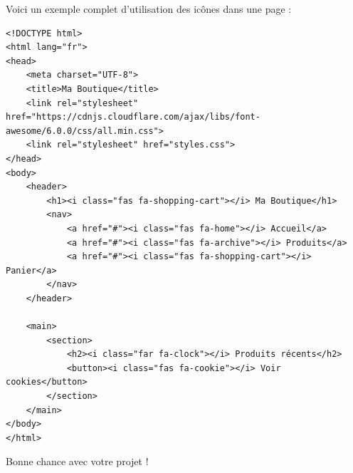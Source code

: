 \documentclass[12pt,a4paper]{article}
\begin{document}
Voici un exemple complet d'utilisation des icônes dans une page :

\begin{lstlisting}
<!DOCTYPE html>
<html lang="fr">
<head>
    <meta charset="UTF-8">
    <title>Ma Boutique</title>
    <link rel="stylesheet" href="https://cdnjs.cloudflare.com/ajax/libs/font-awesome/6.0.0/css/all.min.css">
    <link rel="stylesheet" href="styles.css">
</head>
<body>
    <header>
        <h1><i class="fas fa-shopping-cart"></i> Ma Boutique</h1>
        <nav>
            <a href="#"><i class="fas fa-home"></i> Accueil</a>
            <a href="#"><i class="fas fa-archive"></i> Produits</a>
            <a href="#"><i class="fas fa-shopping-cart"></i> Panier</a>
        </nav>
    </header>

    <main>
        <section>
            <h2><i class="far fa-clock"></i> Produits récents</h2>
            <button><i class="fas fa-cookie"></i> Voir cookies</button>
        </section>
    </main>
</body>
</html>
\end{lstlisting}

Bonne chance avec votre projet !
\end{document}
